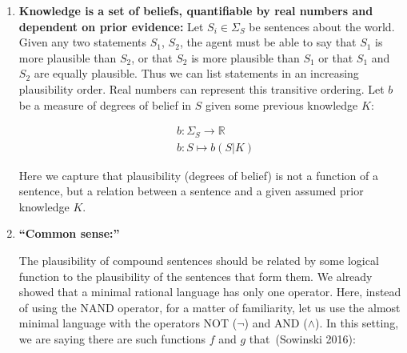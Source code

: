 \documentclass[
  letterpaper,
  12pt,
  british]{tufte-book}
\theoremstyle{plain}
\theoremstyle{plain}
\theoremstyle{definition}
\theoremstyle{remark}
\begin{document}
\begin{enumerate}
\def\labelenumi{\roman{enumi}.}
\item
  \textbf{Knowledge is a set of beliefs, quantifiable by real numbers
  and dependent on prior evidence:} Let \(S_i \in \Sigma_S\) be
  sentences about the world. Given any two statements \(S_1\), \(S_2\),
  the agent must be able to say that \(S_1\) is more plausible than
  \(S_2\), or that \(S_2\) is more plausible than \(S_1\) or that
  \(S_1\) and \(S_2\) are equally plausible. Thus we can list statements
  in an increasing plausibility order. Real numbers can represent this
  transitive ordering. Let
  \(b\) be a measure of degrees of belief in \(S\) given some previous
  knowledge \(K\): 

  \begin{align}
          &b: \Sigma_S \to \mathbb{R}\\
          &b: S \mapsto b(S|K)
  \end{align}

  Here we capture that plausibility (degrees of belief) is not a
  function of a sentence, but a relation between a sentence and a given
  assumed prior knowledge \(K\).
\item
  \textbf{``Common sense:''}

  The plausibility of compound sentences should be related by some
  logical function to the plausibility of the sentences that form them.
  We already showed that a minimal rational language has only one
  operator. Here, instead of using the {NAND} operator, for a matter of
  familiarity, let us use the almost minimal language with the operators
  {NOT} (\(\neg\)) and {AND} (\(\land\)). In this setting, we are saying
  there are such functions \(f\) and \(g\) that~(Sowinski
  2016):


\end{enumerate}
\end{document}
